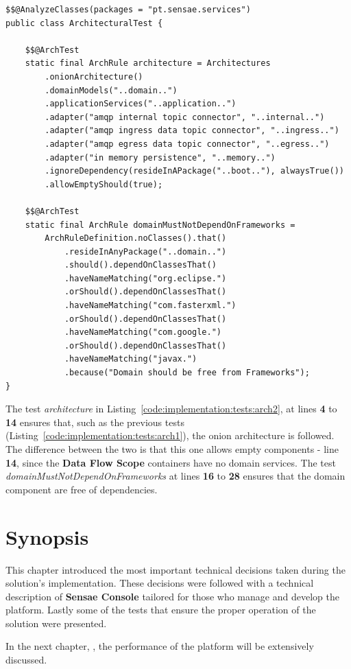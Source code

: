 \begin{lstlisting}[style=Java, caption=Architectural Test - Simplified Onion Architecture - Data Processor Flow, label={code:implementation:tests:arch2}]
$$@AnalyzeClasses(packages = "pt.sensae.services")
public class ArchitecturalTest {

    $$@ArchTest
    static final ArchRule architecture = Architectures
        .onionArchitecture()
        .domainModels("..domain..")
        .applicationServices("..application..")
        .adapter("amqp internal topic connector", "..internal..")
        .adapter("amqp ingress data topic connector", "..ingress..")
        .adapter("amqp egress data topic connector", "..egress..")
        .adapter("in memory persistence", "..memory..")
        .ignoreDependency(resideInAPackage("..boot.."), alwaysTrue())
        .allowEmptyShould(true);

    $$@ArchTest
    static final ArchRule domainMustNotDependOnFrameworks =
        ArchRuleDefinition.noClasses().that()
            .resideInAnyPackage("..domain..")
            .should().dependOnClassesThat()
            .haveNameMatching("org.eclipse.")
            .orShould().dependOnClassesThat()
            .haveNameMatching("com.fasterxml.")
            .orShould().dependOnClassesThat()
            .haveNameMatching("com.google.")
            .orShould().dependOnClassesThat()
            .haveNameMatching("javax.")
            .because("Domain should be free from Frameworks");
}
\end{lstlisting}

The test \textit{architecture} in Listing~\ref{code:implementation:tests:arch2}, at lines \textbf{4} to \textbf{14} ensures that, such as the previous tests (Listing~\ref{code:implementation:tests:arch1}), the onion architecture is followed. The difference between the two is that this one allows empty components - line \textbf{14}, since the \textbf{Data Flow Scope} containers have no domain services. The test \textit{domainMustNotDependOnFrameworks} at lines \textbf{16} to \textbf{28} ensures that the domain component are free of dependencies.

\section{Synopsis}
\label{sec:implementation:synopsis}

This chapter introduced the most important technical decisions taken during the solution's implementation. These decisions were followed with a technical description of \textbf{Sensae Console} tailored for those who manage and develop the platform.
Lastly some of the tests that ensure the proper operation of the solution were presented.

In the next chapter, , the performance of the platform will be extensively discussed.
